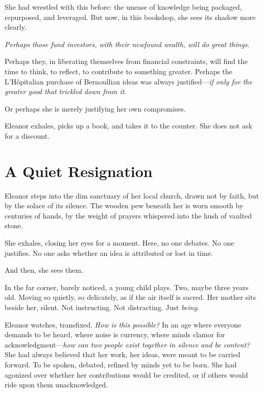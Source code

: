 She had wrestled with this before: the unease of knowledge being packaged, repurposed, and leveraged. But now, in this bookshop, she sees its shadow more clearly.

\smallskip

\textit{Perhaps those fund investors, with their newfound wealth, will do great things.}

\smallskip

Perhaps they, in liberating themselves from financial constraints, will find the time to think, to reflect, to contribute to something greater. Perhaps the L'Hôpitalian purchase of Bernoullian ideas was always justified—\textit{if only for the greater good that trickled down from it.}

\smallskip

Or perhaps she is merely justifying her own compromises.

\smallskip

Eleanor exhales, picks up a book, and takes it to the counter. She does not ask for a discount.

\section*{A Quiet Resignation}

Eleanor steps into the dim sanctuary of her local church, drawn not by faith, but by the solace of its silence. The wooden pew beneath her is worn smooth by centuries of hands, by the weight of prayers whispered into the hush of vaulted stone.

She exhales, closing her eyes for a moment. Here, no one debates. No one justifies. No one asks whether an idea is attributed or lost in time. 

\smallskip

And then, she sees them.

\smallskip

In the far corner, barely noticed, a young child plays. Two, maybe three years old. Moving so quietly, so delicately, as if the air itself is sacred. Her mother sits beside her, silent. Not instructing. Not distracting. Just \textit{being}.

\smallskip

Eleanor watches, transfixed. \textit{How is this possible?} In an age where everyone demands to be heard, where noise is currency, where minds clamor for acknowledgment—\textit{how can two people exist together in silence and be content?} She had always believed that her work, her ideas, were meant to be carried forward. To be spoken, debated, refined by minds yet to be born. She had agonized over whether her contributions would be credited, or if others would ride upon them unacknowledged. 

